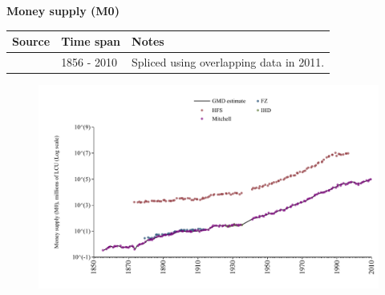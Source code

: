 \documentclass[12pt,a4paper,landscape]{article}
\begin{document}
\begin{adjustbox}{max totalsize={\paperwidth}{\paperheight},center}
\begin{minipage}[t][\textheight][t]{\textwidth}
\vspace*{0.5cm}
{}
\begin{center}
{\Large\bfseries Money supply (M0)}
\end{center}
\vspace{0.5cm}
\begin{table}[H]
\centering
\small
\begin{tabular}{|l|l|l|}
\hline
\textbf{Source} & \textbf{Time span} & \textbf{Notes} \\
\hline
\rowcolor{white}\cite{Mitchell}& 1856 - 2010 &Spliced using overlapping data in 2011. \\
\hline
\end{tabular}
\end{table}
\begin{figure}[H]
\centering
\includegraphics[width=\textwidth,height=0.6\textheight,keepaspectratio]{graphs/ESP_M0.pdf}
\end{figure}
\end{minipage}
\end{adjustbox}
\end{document}
